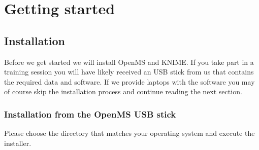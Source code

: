 

\newcommand{\WindowsKnimeInstallerName}{Windows / KNIME\ 4.1.1\ Installer\ (64bit).exe}	
\newcommand{\WindowsOpenMSInstallerName}{Windows / OpenMS-2.5.0-Win64.exe}	
\newcommand{\WindowsOpenMSPrereqInstallerName}{Windows / OpenMS-2.5-prerequisites-installer.exe}
\newcommand{\WindowsPrerequisitesLink}{https://abibuilder.informatik.uni-tuebingen.de/archive/openms/OpenMSInstaller/PrerequisitesInstaller/OpenMS-2.5-prerequisites-installer.exe}
\newcommand{\WindowsDefaultPWizFolder}{C: / Program\ Files / OpenMS-2.5.0 / share / OpenMS / THIRDPARTY / pwiz-bin}
\newcommand{\MacKnimeInstallerName}{Mac / knime\_4.1.0.app.macosx.cocoa.x86\_64.dmg}	
\newcommand{\MacOpenMSInstallerName}{Mac / OpenMS-2.5.0-macOS.dmg}
\newcommand{\KnimeUpdateSite}{http://update.knime.com/analytics-platform/4.1}
\newcommand{\KnimeTrustedSite}{http://update.knime.com/community-contributions/trusted/4.1}
\newcommand{\KnimeTrunkSite}{https://abibuilder.informatik.uni-tuebingen.de/archive/openms/knime-plugin/updateSite/nightly/}
\newcommand{\KnimeUSBUpdateSite}{file:/KNIMEUpdateSite/2.5.0/}

\setcounter{equation}{0}

\section{Getting started}

\subsection{Installation}

Before we get started we will install OpenMS and KNIME. If you take part in a training session you will have likely received an USB stick from us that contains the required data and software. If we provide laptops with the software you may of course skip the installation process and continue reading the next section.

\subsubsection{Installation from the OpenMS USB stick}
Please choose the directory that matches your operating system and execute the installer. 

